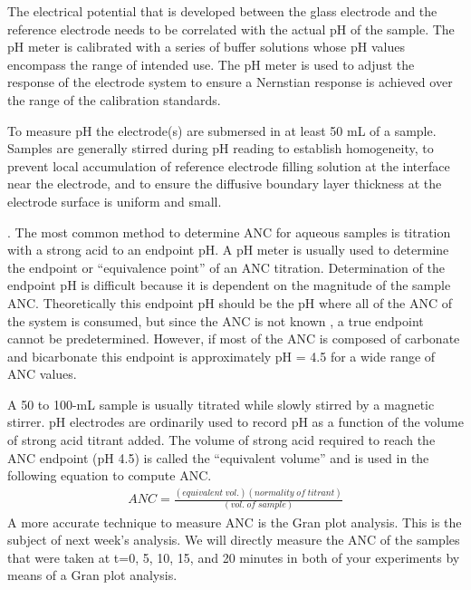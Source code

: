 \documentclass[letterpaper,10pt,english]{sphinxmanual}
\begin{document}
The electrical potential that is developed between the glass electrode and the reference electrode needs to be correlated with the actual pH of the sample. The pH meter is calibrated with a series of buffer solutions whose pH values encompass the range of intended use. The pH meter is used to adjust the response of the electrode system to ensure a Nernstian response is achieved over the range of the calibration standards.

To measure pH the electrode(s) are submersed in at least 50 mL of a sample. Samples are generally stirred during pH reading to establish homogeneity, to prevent local accumulation of reference electrode filling solution at the interface near the electrode, and to ensure the diffusive boundary layer thickness at the electrode surface is uniform and small.

. The most common method to determine ANC for aqueous samples is titration with a strong acid to an endpoint pH. A pH meter is usually used to determine the endpoint or “equivalence point” of an ANC titration. Determination of the endpoint pH is difficult because it is dependent on the magnitude of the sample ANC. Theoretically this endpoint pH should be the pH where all of the ANC of the system is consumed, but since the ANC is not known , a true endpoint cannot be predetermined. However, if most of the ANC is composed of carbonate and bicarbonate this endpoint is approximately pH = 4.5 for a wide range of ANC values.

A 50 to 100-mL sample is usually titrated while slowly stirred by a magnetic stirrer. pH electrodes are ordinarily used to record pH as a function of the volume of strong acid titrant added. The volume of strong acid required to reach the ANC endpoint (pH 4.5) is called the “equivalent volume” and is used in the following equation to compute ANC.
\begin{equation}\label{equation:Acid_Rain/Acid_Rain:Acid_Rain/Acid_Rain:12}
\begin{split}ANC = \frac{{(equivalent\; vol.)(normality\; of\; titrant)}}{{(vol.\; of\; sample)}}\end{split}
\end{equation}
A more accurate technique to measure ANC is the Gran plot analysis. This is the subject of next week’s analysis. We will directly measure the ANC of the samples that were taken at t=0, 5, 10, 15, and 20 minutes in both of your experiments by means of a Gran plot analysis.
\end{document}
